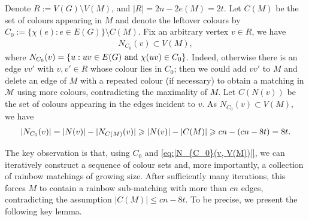 \documentclass[11pt,reqno]{amsart}
\theoremstyle{definition}
\theoremstyle{remark}
\newcommand\cM{\mathcal{M}}
\renewcommand\geq{\geqslant}
\renewcommand\le{\leqslant}
\renewcommand\ge{\geqslant}
\begin{document}
Denote $R:=V(G)\setminus V(M)$, and $|R|=2n-2e(M)=2t.$ 
Let $C(M)$ be the set of colours appearing in $M$ and denote the leftover colours by $C_0:=\{\chi(e):e\in E(G)\}\setminus C(M)$. Fix an arbitrary vertex $v\in R$, we have
\begin{align}\label{eq:N(v)inM}
N_{C_0}(v)\subset V(M),    
\end{align}
where $N_{C_0}(v)=\{u:uv\in E(G){\rm \ and}\ \chi(uv)\in C_0\}$. 
Indeed, otherwise there is an edge $vv'$ with $v,v'\in R$ whose colour lies in $C_0$; then we could add $vv'$ to $M$ and delete an edge of $M$ with a repeated colour (if necessary) to obtain a matching in $\cM$ using more colours, contradicting the maximality of $M$.
Let $C(N(v))$ be the set of colours appearing in the edges incident to $v$. As $N_{C_0}(v)\subset V(M),$ we have
\begin{align}
|N_{C_0}(v)|= |N(v)| - |N_{C(M)}(v)|\ge |N(v)| - |C(M)|\geq 
cn - (cn-8t)= 8t.  \label{eq:|N_{C_0}(v, V(M))|}
\end{align}

The key observation is that, using $C_0$ and \eqref{eq:|N_{C_0}(v, V(M))|}, we can iteratively construct a sequence of colour sets and, more importantly, a collection of rainbow matchings of growing size. After sufficiently many iterations, this forces $M$ to contain a rainbow sub-matching with more than $cn$ edges, contradicting the assumption $|C(M)|\le cn-8t$. To be precise, we present the following key lemma.
\end{document}
